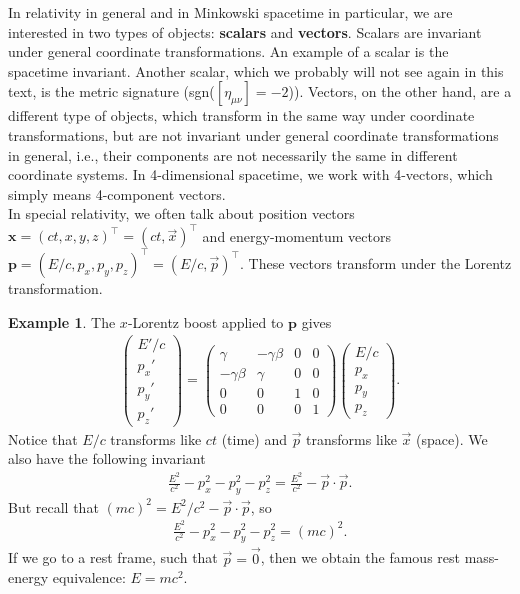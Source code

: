 \documentclass{article}
\theoremstyle{definition}
\newtheorem{exmp}{Example}[section]
\begin{document}
In relativity in general and in Minkowski spacetime in particular, we are interested in two types of objects: \textbf{scalars} and \textbf{vectors}. Scalars are invariant under general coordinate transformations. An example of a scalar is the spacetime invariant. Another scalar, which we probably will not see again in this text, is the metric signature (sgn($[\eta_{\mu\nu}] = -2$)). Vectors, on the other hand, are a different type of objects, which transform in the same way under coordinate transformations, but are not invariant under general coordinate transformations in general, i.e., their components are not necessarily the same in different coordinate systems. In 4-dimensional spacetime, we work with 4-vectors, which simply means 4-component vectors.\\

In special relativity, we often talk about position vectors $\mathbf{x} = (ct,x,y,z)^\top = (ct,\vec{x})^\top$ and energy-momentum vectors $\mathbf{p} = (E/c,p_x,p_y,p_z)^\top = (E/c, \vec{p})^\top$. These vectors transform under the Lorentz transformation. 
\begin{exmp}
The $x$-Lorentz boost applied to $\mathbf{p}$ gives
\begin{align*}
\begin{pmatrix}
E'/c\\p_x'\\p_y'\\p_z'
\end{pmatrix}
=
\begin{pmatrix}
\gamma & -\gamma\beta & 0 & 0\\
-\gamma\beta & \gamma & 0 & 0\\
0 & 0 & 1 & 0\\
0 & 0 & 0 & 1
\end{pmatrix}
\begin{pmatrix}
E/c\\p_x\\p_y\\p_z
\end{pmatrix}.
\end{align*}
Notice that $E/c$ transforms like $ct$ (time) and $\vec{p}$ transforms like $\vec{x}$ (space). We also have the following invariant
\begin{align*}
\frac{E^2}{c^2} - p^2_x - p^2_y - p^2_z = \frac{E^2}{c^2} - \vec{p}\cdot\vec{p}.
\end{align*}
But recall that $(mc)^2 = E^2/c^2 - \vec{p}\cdot\vec{p}$, so
\begin{align*}
\frac{E^2}{c^2} - p^2_x - p^2_y - p^2_z = (mc)^2.
\end{align*} 
If we go to a rest frame, such that $\vec{p} = \vec{0}$, then we obtain the famous rest mass-energy equivalence: $E = mc^2$.
\end{exmp}
\end{document}
